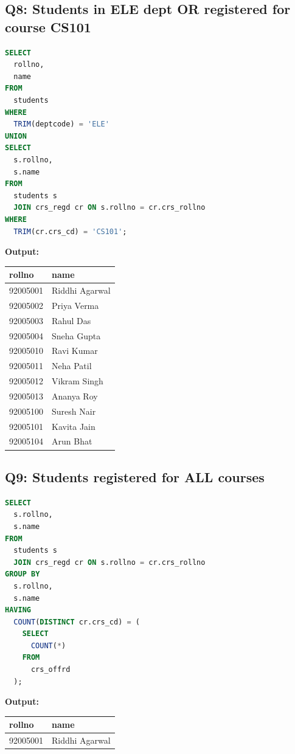 \documentclass[11pt, a4paper]{article}
\begin{document}
\subsection*{Q8: Students in ELE dept OR registered for course CS101}
\begin{lstlisting}[language=SQL]
SELECT
  rollno,
  name
FROM
  students
WHERE
  TRIM(deptcode) = 'ELE'
UNION
SELECT
  s.rollno,
  s.name
FROM
  students s
  JOIN crs_regd cr ON s.rollno = cr.crs_rollno
WHERE
  TRIM(cr.crs_cd) = 'CS101';
\end{lstlisting}
\vspace{0.3cm}
\textbf{Output:}\vspace{0.2cm}
\begin{center}
\begin{tabular}{|l|l|}
\hline
\textbf{rollno} & \textbf{name} \\ \hline
92005001 & Riddhi Agarwal                 \\ \hline
92005002 & Priya Verma                    \\ \hline
92005003 & Rahul Das                      \\ \hline
92005004 & Sneha Gupta                    \\ \hline
92005010 & Ravi Kumar                     \\ \hline
92005011 & Neha Patil                     \\ \hline
92005012 & Vikram Singh                   \\ \hline
92005013 & Ananya Roy                     \\ \hline
92005100 & Suresh Nair                    \\ \hline
92005101 & Kavita Jain                    \\ \hline
92005104 & Arun Bhat                      \\ \hline
\end{tabular}
\end{center}
\newpage
\subsection*{Q9: Students registered for ALL courses}
\begin{lstlisting}[language=SQL]
SELECT
  s.rollno,
  s.name
FROM
  students s
  JOIN crs_regd cr ON s.rollno = cr.crs_rollno
GROUP BY
  s.rollno,
  s.name
HAVING
  COUNT(DISTINCT cr.crs_cd) = (
    SELECT
      COUNT(*)
    FROM
      crs_offrd
  );
\end{lstlisting}
\vspace{0.3cm}
\textbf{Output:}\vspace{0.2cm}
\begin{center}
\begin{tabular}{|l|l|}
\hline
\textbf{rollno} & \textbf{name} \\ \hline
92005001 & Riddhi Agarwal                 \\ \hline
\end{tabular}
\end{center}
\newpage
\end{document}
